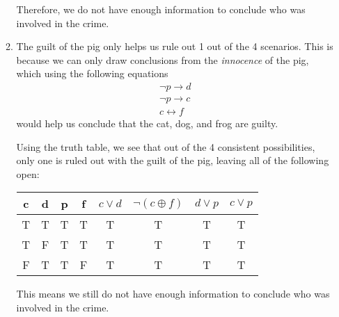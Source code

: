 \documentclass{article}
\newcommand*\xor{\oplus}
\begin{document}
\begin{enumerate}
\begin{enumerate}
		            Therefore, we do not have enough information to conclude who was involved in the crime.

		      \item The guilt of the pig only helps us rule out 1 out of the 4 scenarios. This is because
		            we can only draw conclusions from the \textit{innocence} of the pig, which using the
		            following equations
		            \begin{align*}
			            \lnot p \to d \\
			            \lnot p \to c \\
			            c \leftrightarrow f
		            \end{align*}
		            would help us conclude that the cat, dog, and frog are guilty.

		            Using the truth table, we see that out of the 4 consistent possibilities,
		            only one is ruled out with the guilt of the pig, leaving all of the following
		            open:

		            \begin{tabular}{|c|c|c|c||c|c|c|c|}
			            \hline
			            c & d & p & f & $c \lor d$ & $\lnot(c\xor f)$ & $d \lor p$ & $c \lor p$ \\
			            \hline
			            T & T & T & T & T          & T                & T          & T          \\
			            T & F & T & T & T          & T                & T          & T          \\
			            F & T & T & F & T          & T                & T          & T          \\
			            \hline
		            \end{tabular}

		            This means we still do not have enough information to conclude who was
		            involved in the crime.
	      \end{enumerate}
\end{enumerate}
\end{document}
